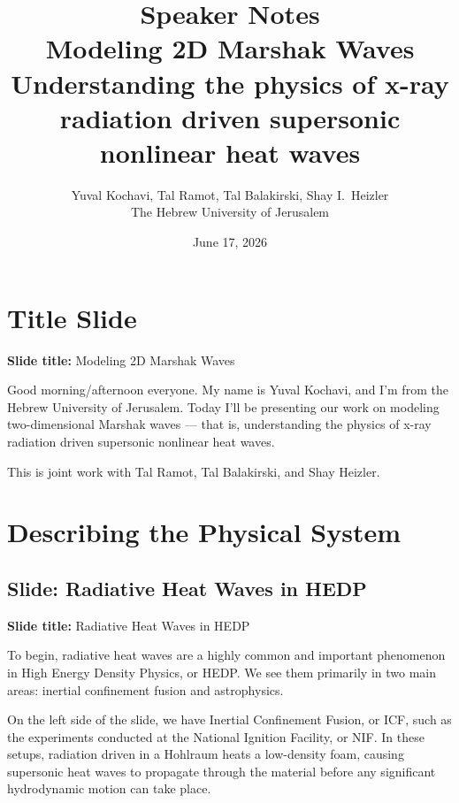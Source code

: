 \documentclass[12pt, a4paper]{article}
\title{\textbf{Speaker Notes}\\[0.3cm]
\Large Modeling 2D Marshak Waves\\[0.2cm]
\normalsize Understanding the physics of x-ray radiation driven supersonic nonlinear heat waves}
\author{Yuval Kochavi, Tal Ramot, Tal Balakirski, Shay I.\ Heizler\\
The Hebrew University of Jerusalem}
\date{June 17, 2026}
\begin{document}
\maketitle
\thispagestyle{fancy}
\tableofcontents
\newpage

\section{Title Slide}

\begin{slidebox}
\textbf{Slide title:} Modeling 2D Marshak Waves
\end{slidebox}

Good morning/afternoon everyone. My name is Yuval Kochavi, and I'm from the Hebrew University of Jerusalem. Today I'll be presenting our work on modeling two-dimensional Marshak waves --- that is, understanding the physics of x-ray radiation driven supersonic nonlinear heat waves.

This is joint work with Tal Ramot, Tal Balakirski, and Shay Heizler.

\section{Describing the Physical System}

\subsection{Slide: Radiative Heat Waves in HEDP}

\begin{slidebox}
\textbf{Slide title:} Radiative Heat Waves in HEDP
\end{slidebox}

To begin, radiative heat waves are a highly common and important phenomenon in High Energy Density Physics, or HEDP. We see them primarily in two main areas: inertial confinement fusion and astrophysics.

On the left side of the slide, we have Inertial Confinement Fusion, or ICF, such as the experiments conducted at the National Ignition Facility, or NIF. In these setups, radiation driven in a Hohlraum heats a low-density foam, causing supersonic heat waves to propagate through the material before any significant hydrodynamic motion can take place.
\end{document}
